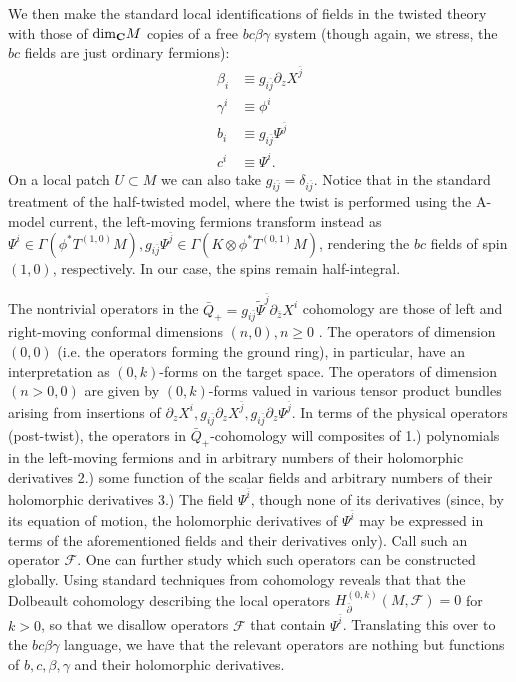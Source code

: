 \documentclass[11pt]{amsart}
\newcommand{\C}{\mathbf C}
\theoremstyle{thm}
\numberwithin{equation}{subsection}
\theoremstyle{def}
\theoremstyle{rem}
\begin{document}
We then make the standard local identifications of fields in the twisted theory with those of ${\rm dim}_{\C}M$ copies of a free $bc\beta\gamma$ system (though again, we stress, the $bc$ fields are just ordinary fermions):
\begin{align*}
\beta_i &\equiv g_{i \bar{j}}\partial_z X^{\bar{j}} \\
\gamma^i &\equiv \phi^i \\
b_i &\equiv g_{i \bar{j}} \Psi^{\bar{j}} \\
c^i &\equiv \Psi^i.
\end{align*}
On a local patch $U \subset M$ we can also take $g_{i\bar{j}} = \delta_{i \bar{j}}$.
Notice that in the standard treatment of the half-twisted model, where the twist is performed using the A-model current, the left-moving fermions transform instead as $\Psi^i \in \Gamma(\phi^* T^{(1, 0)}M), g_{i \bar{j}}\Psi^{\bar{j}} \in \Gamma(K \otimes \phi^* T^{(0, 1)}M)$, rendering the $bc$ fields of spin $(1, 0)$, respectively. In our case, the spins remain half-integral.

The nontrivial operators in the $\bar{Q}_+ = g_{i \bar{j}}\tilde{\Psi}^{\bar{j}} \partial_{\bar{z}}X^i$ cohomology are those of left and right-moving conformal dimensions $(n, 0), n \geq 0$ \cite{Tan,CostelloHol,ESW}. 
The operators of dimension $(0, 0)$ (i.e. the operators forming the ground ring), in particular, have an interpretation as $(0,k)$-forms on the target space. 
The operators of dimension $(n > 0, 0)$ are given by $(0, k)$-forms valued in various tensor product bundles arising from insertions of $\partial_z X^i, g_{i \bar{j}}\partial_z X^{\bar{j}}, g_{i \bar{j}}\partial_z \Psi^{\bar{j}}$. In terms of the physical operators (post-twist), the operators in $\bar{Q}_+$-cohomology will composites of 1.) polynomials in the left-moving fermions and in arbitrary numbers of their holomorphic derivatives 2.) some function of the scalar fields and arbitrary numbers of their holomorphic derivatives 3.) The field $\Psi^{\bar{i}}$, though none of its derivatives (since, by its equation of motion, the holomorphic derivatives of $\Psi^{\bar{i}}$ may be expressed in terms of the aforementioned fields and their derivatives only). Call such an operator $\mathcal{F}$. One can further study which such operators can be constructed globally. Using standard techniques from cohomology reveals that that the Dolbeault cohomology describing the local operators $H_{\bar{\partial}}^{(0,k)}(M, \mathcal{F})=0$ for $k>0$, so that we disallow operators $\mathcal{F}$ that contain $\Psi^{\bar{i}}$. Translating this over to the $bc\beta\gamma$ language, we have that the relevant operators are nothing but functions of $b, c, \beta, \gamma$ and their holomorphic derivatives.
\end{document}
